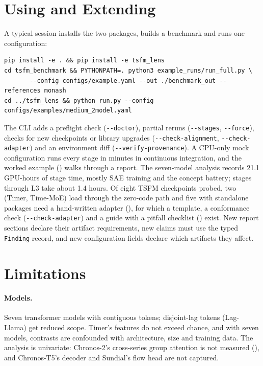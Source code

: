\section{Using and Extending \tool{}}
\label{sec:usage}

A typical session installs the two packages, builds a benchmark and runs one configuration:
\begin{center}
\begin{minipage}{0.95\textwidth}
\footnotesize
\begin{verbatim}
pip install -e . && pip install -e tsfm_lens
cd tsfm_benchmark && PYTHONPATH=. python3 example_runs/run_full.py \
       --config configs/example.yaml --out ./benchmark_out --references monash
cd ../tsfm_lens && python run.py --config configs/examples/medium_2model.yaml
\end{verbatim}
\end{minipage}
\end{center}
The CLI adds a preflight check (\texttt{-{}-doctor}), partial reruns (\texttt{-{}-stages}, \texttt{-{}-force}),
checks for new checkpoints or library upgrades (\texttt{-{}-check-alignment}, \texttt{-{}-check-adapter}) and an
environment diff (\texttt{-{}-verify-provenance}). A CPU-only mock configuration runs every stage in minutes in continuous
integration, and the worked example (\repo{tsfm_lens/docs/worked_example.md}) walks through a report. The seven-model analysis records
21.1 GPU-hours of stage time, mostly SAE training and the concept battery; stages through L3 take about 1.4 hours. Of eight
TSFM checkpoints probed, two (Timer, Time-MoE) load through the zero-code path and five with standalone packages
need a hand-written adapter (\fid{MN-25}), for which a template, a conformance check
(\texttt{-{}-check-adapter}) and a guide with a pitfall checklist () exist. New report sections declare their artifact requirements, new claims must use the
typed \texttt{Finding} record, and new configuration fields declare which artifacts they affect.

\section{Limitations}
\label{sec:limitations}

\paragraph{Models.} Seven transformer models with contiguous tokens; disjoint-lag tokens (Lag-Llama) get
reduced scope. Timer's features do not exceed chance, and with seven models, contrasts are confounded with architecture, size and
training data. The analysis is univariate: Chronos-2's cross-series group attention is not measured
(\fid{PM-13}), and Chronos-T5's decoder and Sundial's flow head are not captured.

